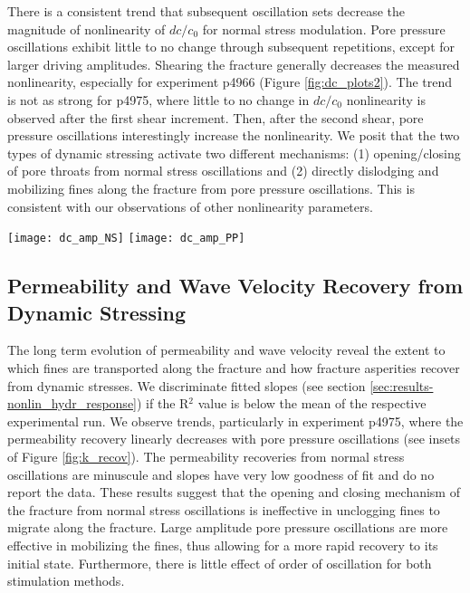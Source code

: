 \documentclass[draft]{agujournal2019}
\begin{document}
There is a consistent trend that subsequent oscillation sets decrease the magnitude of nonlinearity of $ dc/c_0 $ for normal stress modulation. Pore pressure oscillations exhibit little to no change through subsequent repetitions, except for larger driving amplitudes.  Shearing the fracture generally decreases the measured nonlinearity, especially for experiment p4966 (Figure \ref{fig:dc_plots2}). The trend is not as strong for p4975, where little to no change in $ dc/c_0 $ nonlinearity is observed after the first shear increment. Then, after the second shear, pore pressure oscillations interestingly increase the nonlinearity. We posit that the two types of dynamic stressing activate two different mechanisms: (1) opening/closing of pore throats from normal stress oscillations and (2) directly dislodging and mobilizing fines along the fracture from pore pressure oscillations. This is consistent with our observations of other nonlinearity parameters. 

\begin{figure*}[ht]
	\centering
	\texttt{[image: dc\_amp\_NS]}
	\texttt{[image: dc\_amp\_PP]}
	\caption{Velocity amplitude modulation averaged over all receivers ($ dc/c_0 $) as a function of normal stress and Pore pressure oscillations. There is a systematic reduction in $ dc/c_0 $ with accumulated shear for normal stress oscillations and there is very little variation in the oscillation order. The results from pore pressure oscillations in p4966 tell a similar story as the normal stress oscillations, but the pore pressure oscillations in p4975 show no change from post-fracture to post-shear 1 and an increase in $ dc/c_0 $ from post-shear 1 to 2.}
	\label{fig:dc_plots2}
\end{figure*}


\subsection{Permeability and Wave Velocity Recovery from Dynamic Stressing}

The long term evolution of permeability and wave velocity reveal the extent to which fines are transported along the fracture and how fracture asperities recover from dynamic stresses. We discriminate fitted slopes (see section \ref{sec:results-nonlin_hydr_response}) if the R$^2$ value is below the mean of the respective experimental run. We observe trends, particularly in experiment p4975, where the permeability recovery linearly decreases with pore pressure oscillations (see insets of Figure \ref{fig:k_recov}). The permeability recoveries from normal stress oscillations are minuscule and slopes have very low goodness of fit and do no report the data. These results suggest that the opening and closing mechanism of the fracture from normal stress oscillations is ineffective in unclogging fines to migrate along the fracture. Large amplitude pore pressure oscillations are more effective in mobilizing the fines, thus allowing for a more rapid recovery to its initial state. Furthermore, there is little effect of order of oscillation for both stimulation methods. 
\end{document}
